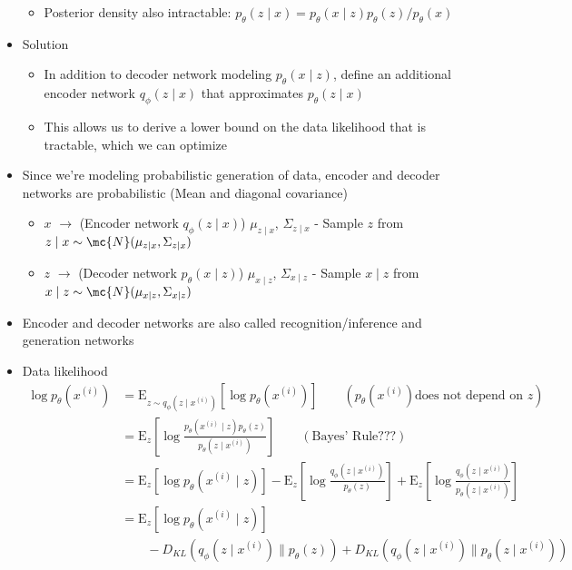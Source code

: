 \begin{itemize}
\begin{itemize}
		\item Posterior density also intractable: $p_\theta (z\mid x) = p_\theta(x\mid z)p_\theta(z)/ p_\theta(x)$
	\end{itemize}
	\item Solution
	\begin{itemize}
		\item In addition to decoder network modeling $p_\theta (x\mid z)$, define an additional encoder network $q_\phi(z\mid x)$ that approximates $p_\theta(z\mid x)$
		\item This allows us to derive a lower bound on the data likelihood that is tractable, which we can optimize
	\end{itemize}
	\item Since we're modeling probabilistic generation of data, encoder and decoder networks are probabilistic (Mean and diagonal covariance)
	\begin{itemize}
		\item $x$ $\rightarrow$ (Encoder network $q_\phi (z\mid x)$) $\mu_{z\mid x}$, $\Sigma_{z\mid x}$ - Sample $z$ from $z\mid x \sim \mc{N}(\mu_{z\mid x}, \Sigma_{z\mid x})$
		\item $z$ $\rightarrow$ (Decoder network $p_\theta (x\mid z)$) $\mu_{x\mid z}$, $\Sigma_{x\mid z}$ - Sample $x\mid z$ from $x\mid z \sim \mc{N}(\mu_{x\mid z}, \Sigma_{x\mid z})$
	\end{itemize}
	\item Encoder and decoder networks are also called recognition/inference and generation networks
	\item Data likelihood
	$$\begin{aligned}
		\log p_\theta\left(x^{(i)}\right) &= \mathrm{E}_{z\sim q_\phi(z\mid x^{(i)})}\left[\log p_\theta \left(x^{(i)}\right)\right] \qquad \left(p_\theta\left(x^{(i)}\right) \text{does not depend on } z\right)\\
		&= \mathrm{E}_{z} \left[\log\frac{p_\theta(x^{(i)} \mid z) p_\theta(z)}{p_\theta(z\mid x^{(i)})}\right] \qquad \left(\text{Bayes' Rule} ???\right)\\
		&= \mathrm{E}_{z}\left[\log p_\theta(x^{(i)} \mid z)\right] - \mathrm{E}_{z}\left[\log\frac{q_\phi\left(z\mid x^{(i)}\right)}{p_\theta(z)}\right] + \mathrm{E}_{z}\left[\log\frac{q_\phi\left(z\mid x^{(i)}\right)}{p_\theta\left(z\mid x^{(i)}\right)}\right] \\
		&=\mathrm{E}_{z}\left[\log p_\theta(x^{(i)} \mid z)\right] \\&\qquad - D_{KL}\left(q_\phi\left(z\mid x^{(i)}\right) \parallel p_\theta(z) \right) + D_{KL}\left(q_\phi\left(z\mid x^{(i)}\right) \parallel p_\theta\left(z\mid x^{(i)}\right)\right)\\

\end{aligned}$$
\end{itemize}
